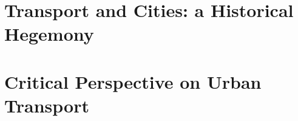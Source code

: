 \documentclass{article}
\begin{document}
\textbf{}

\textbf{}

\textbf{}

\textbf{}

\textbf{}

\pagebreak\section{Transport and Cities: a Historical Hegemony}

\textbf{}

\textbf{}

\textbf{}

\textbf{}

\textbf{}

\textbf{}

\textbf{}

\textbf{}

\textbf{}

\pagebreak\section{Critical Perspective on Urban Transport}

\textbf{}

\textbf{}

\textbf{}

\textbf{}

\textbf{}

\textbf{}

\textbf{}

\textbf{}

\textbf{}
\end{document}
